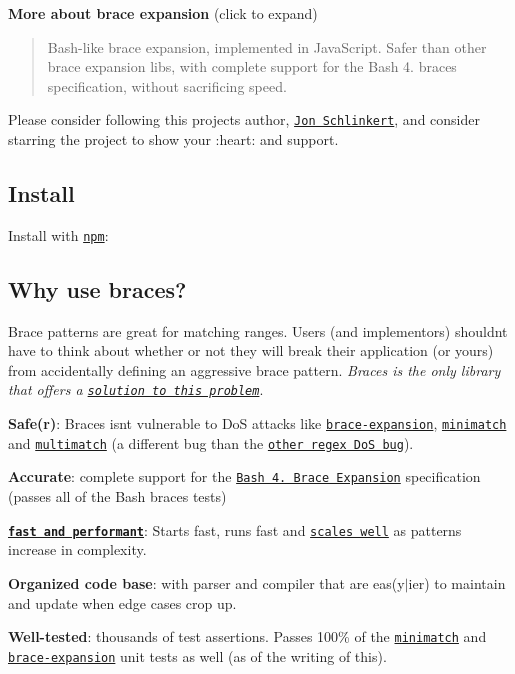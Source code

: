 {\bfseries More about brace expansion} (click to expand)

\begin{quote}
Bash-\/like brace expansion, implemented in Java\+Script. Safer than other brace expansion libs, with complete support for the Bash 4. braces specification, without sacrificing speed. \end{quote}


Please consider following this project\textquotesingle{}s author, \href{https://github.com/jonschlinkert}{\tt Jon Schlinkert}, and consider starring the project to show your \+:heart\+: and support.

\subsection*{Install}

Install with \href{https://www.npmjs.com/}{\tt npm}\+:




\subsection*{Why use braces?}

Brace patterns are great for matching ranges. Users (and implementors) shouldn\textquotesingle{}t have to think about whether or not they will break their application (or yours) from accidentally defining an aggressive brace pattern. {\itshape Braces is the only library that offers a \href{#performance}{\tt solution to this problem}}.


\begin{DoxyItemize}
\item {\bfseries Safe(r)}\+: Braces isn\textquotesingle{}t vulnerable to DoS attacks like \href{https://github.com/juliangruber/brace-expansion}{\tt brace-\/expansion}, \href{https://github.com/isaacs/minimatch}{\tt minimatch} and \href{https://github.com/sindresorhus/multimatch}{\tt multimatch} (a different bug than the \href{https://medium.com/node-security/minimatch-redos-vulnerability-590da24e6d3c#.jew0b6mpc}{\tt other regex DoS bug}).
\item {\bfseries Accurate}\+: complete support for the \href{www.gnu.org/software/bash/}{\tt Bash 4. Brace Expansion} specification (passes all of the Bash braces tests)
\item {\bfseries \href{#benchmarks}{\tt fast and performant}}\+: Starts fast, runs fast and \href{#performance}{\tt scales well} as patterns increase in complexity.
\item {\bfseries Organized code base}\+: with parser and compiler that are eas(y$\vert$ier) to maintain and update when edge cases crop up.
\item {\bfseries Well-\/tested}\+: thousands of test assertions. Passes 100\% of the \href{https://github.com/isaacs/minimatch}{\tt minimatch} and \href{https://github.com/juliangruber/brace-expansion}{\tt brace-\/expansion} unit tests as well (as of the writing of this).
\end{DoxyItemize}

